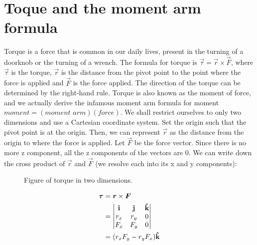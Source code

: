 \section*{Toque and the moment arm formula}
  Torque is a force that is common in our daily lives, present in the turning of a doorknob or the turning of a wrench. The formula for torque is \(\vec{\tau} = \vec{r}\times\vec{F}\), where \(\vec{\tau}\) is the torque, \(\vec{r}\) is the distance from the pivot point to the point where the force is applied and \(\vec{F}\) is the force applied. The direction of the torque can be determined by the right-hand rule. Torque is also known as the moment of force, and we actually derive the infamous moment arm formula for moment \(\textit{moment}=(\textit{moment arm})(\textit{force})\). We shall restrict ourselves to only two dimensions and use a Cartesian coordinate system. Set the origin such that the pivot point is at the origin. Then, we can represent \(\vec{r}\) as the distance from the origin to where the force is applied. Let \(\vec{F}\) be the force vector. Since there is no more z component, all the z components of the vectors are 0. We can write down the cross product of \(\vec{r}\) and \(\vec{F}\) (we resolve each into its x and y components):
  \begin{figure}[H]
    \centering
    \caption{Figure of torque in two dimensions.}
    \label{figtorque}
  \end{figure}
  \begin{align*}
    \vec{\tau} &= \vec{r}\times\vec{F} \\
    &= \begin{vmatrix}
      \ihat & \jhat & \khat \\
      r_x & r_y & 0 \\
      F_x & F_y & 0
    \end{vmatrix} \\
    &= (r_xF_y - r_yF_x)\khat
  \end{align*}


